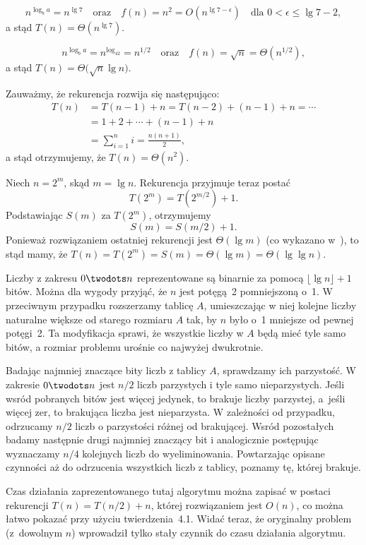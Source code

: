 \subexercise{} %
\[
	n^{\log_ba} = n^{\lg7} \quad\text{oraz}\quad f(n) = n^2 = O(n^{\lg7-\epsilon}) \quad\text{dla $0<\epsilon\le\lg7-2$},
\]
a stąd $T(n)=\Theta(n^{\lg7})$.

\subexercise{} %
\[
	n^{\log_ba} = n^{\log_42} = n^{1/2} \quad\text{oraz}\quad f(n) = \sqrt{n} = \Theta(n^{1/2}),
\]
a stąd $T(n)=\Theta\bigl(\!\sqrt{n}\lg n\bigr)$.

\subexercise{} %
Zauważmy, że rekurencja rozwija się następująco:
\begin{align*}
	T(n) &= T(n-1)+n = T(n-2)+(n-1)+n = \cdots \\
	&= 1+2+\cdots+(n-1)+n \\
	&= \sum_{i=1}^ni = \frac{n(n+1)}{2},
\end{align*}
a stąd otrzymujemy, że $T(n)=\Theta(n^2)$.

\subexercise{} %
Niech $n=2^m$, skąd $m=\lg n$. Rekurencja przyjmuje teraz postać
\[
	T(2^m) = T(2^{m/2})+1.
\]
Podstawiając $S(m)$ za $T(2^m)$, otrzymujemy
\[
	S(m) = S(m/2)+1.
\]
Ponieważ rozwiązaniem ostatniej rekurencji jest $\Theta(\lg m)$ (co wykazano w~), to stąd mamy, że $T(n)=T(2^m)=S(m)=\Theta(\lg m)=\Theta(\lg\lg n)$.

Liczby z zakresu $0\twodots n$ reprezentowane są binarnie za pomocą $\lfloor\lg n\rfloor+1$ bitów. Można dla wygody przyjąć, że $n$ jest potęgą~2 pomniejszoną o~1. W przeciwnym przypadku rozszerzamy tablicę $A$, umieszczając w niej kolejne liczby naturalne większe od starego rozmiaru $A$ tak, by $n$ było o~1 mniejsze od pewnej potęgi~2. Ta modyfikacja sprawi, że wszystkie liczby w $A$ będą mieć tyle samo bitów, a rozmiar problemu urośnie co najwyżej dwukrotnie.

Badając najmniej znaczące bity liczb z tablicy $A$, sprawdzamy ich parzystość. W zakresie $0\twodots n$ jest $n/2$ liczb parzystych i tyle samo nieparzystych. Jeśli wsród pobranych bitów jest więcej jedynek, to brakuje liczby parzystej, a~jeśli więcej zer, to brakująca liczba jest nieparzysta. W zależności od przypadku, odrzucamy $n/2$ liczb o parzystości różnej od brakującej. Wsród pozostałych badamy następnie drugi najmniej znaczący bit i analogicznie postępując wyznaczamy $n/4$ kolejnych liczb do wyeliminowania. Powtarzając opisane czynności aż do odrzucenia wszystkich liczb z tablicy, poznamy tę, której brakuje.

Czas działania zaprezentowanego tutaj algorytmu można zapisać w postaci rekurencji $T(n)=T(n/2)+n$, której rozwiązaniem jest $O(n)$, co można łatwo pokazać przy użyciu twierdzenia~4.1. Widać teraz, że oryginalny problem (z~dowolnym $n$) wprowadził tylko stały czynnik do czasu działania algorytmu.


